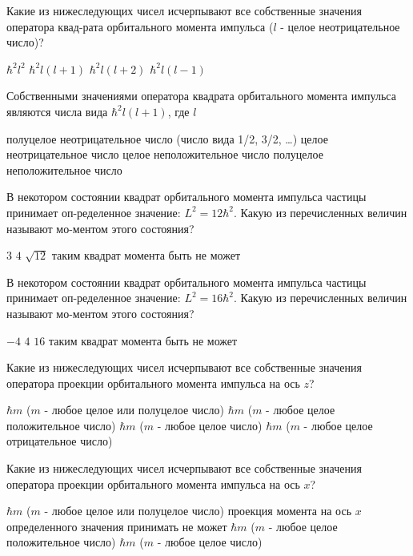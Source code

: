 \documentclass[11pt,a4paper]{exam}
\begin{document}
\begin{questions}

\question Какие из нижеследующих чисел исчерпывают все собственные значения оператора квад-рата орбитального момента импульса ($l$ - целое неотрицательное число)?
\begin{choices}
\choice ${\hbar ^2}{l^2}$ 
\choice ${\hbar ^2}l(l + 1)$    
\choice ${\hbar ^2}l(l + 2)$    
\choice ${\hbar ^2}l(l - 1)$
\end{choices}

\question Собственными значениями оператора квадрата орбитального момента импульса являются числа вида ${\hbar ^2}l(l + 1)$, где $l$
\begin{choices}
\choice полуцелое неотрицательное число (число вида 1/2, 3/2, …)
\choice целое неотрицательное число
\choice целое неположительное число
\choice полуцелое неположительное число
\end{choices}

\question В некотором состоянии квадрат орбитального момента импульса частицы принимает оп-ределенное значение: ${L^2} = 12{\hbar ^2}$. Какую из перечисленных величин называют мо-ментом этого состояния?
\begin{choices}
\choice $3$      
\choice $4$      
\choice $\sqrt {12} $  
\choice таким квадрат момента быть не может
\end{choices}

\question В некотором состоянии квадрат орбитального момента импульса частицы принимает оп-ределенное значение: ${L^2} = 16{\hbar ^2}$. Какую из перечисленных величин называют мо-ментом этого состояния?
\begin{choices}
\choice $ - 4$      
\choice $4$      
\choice $16$     
\choice таким квадрат момента быть не может
\end{choices}

\question Какие из нижеследующих чисел исчерпывают все собственные значения оператора проекции орбитального момента импульса на ось $z$?
\begin{choices}
\choice $\hbar m$ ($m$ - любое целое или полуцелое число)
\choice $\hbar m$ ($m$ - любое целое положительное число)
\choice $\hbar m$ ($m$ - любое целое число)
\choice $\hbar m$ ($m$ - любое целое отрицательное число)
\end{choices}

\question Какие из нижеследующих чисел исчерпывают все собственные значения оператора проекции орбитального момента импульса на ось $x$?
\begin{choices}
\choice $\hbar m$ ($m$ - любое целое или полуцелое число)
\choice проекция момента на ось $x$ определенного значения принимать не может
\choice $\hbar m$ ($m$ - любое целое положительное число)
\choice $\hbar m$ ($m$ - любое целое число)
\end{choices}


\end{questions}
\end{document}
